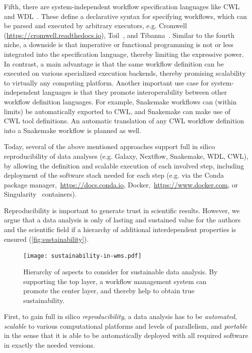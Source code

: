 \documentclass[parskip=half, DIV=18]{scrartcl}
\let\plainurl\url
\renewcommand{\url}[1]{\protect\plainurl{#1}}
\begin{document}
Fifth, there are system-independent workflow specification languages like CWL~\parencite{cwl} and WDL~\parencite{voss_full-stack_2017}.
These define a declarative syntax for specifying workflows, which can be parsed and executed by arbitrary executors, e.g. Cromwell (\url{https://cromwell.readthedocs.io}), Toil~\parencite{Vivian_2017}, and Tibanna~\parencite{Lee_2019}.
Similar to the fourth niche, a downside is that imperative or functional programming is not or less integrated into the specification language, thereby limiting the expressive power.
In contrast, a main advantage is that the same workflow definition can be executed on various specialized execution backends, thereby promising scalability to virtually any computing platform.
Another important use case for system-independent languages is that they promote interoperability between other workflow definition languages.
For example, Snakemake workflows can (within limits) be automatically exported to CWL, and Snakemake can make use of CWL tool definitions.
An automatic translation of any CWL workflow definition into a Snakemake workflow is planned as well.

Today, several of the above mentioned approaches support full in silico reproducibility of data analyses (e.g. Galaxy, Nextflow, Snakemake, WDL, CWL), by allowing the definition and scalable execution of each involved step, including deployment of the software stack needed for each step (e.g. via the Conda package manager,~\url{https://docs.conda.io}, Docker,~\url{https://www.docker.com}, or Singularity~\parencite{kurtzer_singularity_2017} containers).

Reproducibility is important to generate trust in scientific results.
However, we argue that a data analysis is only of lasting and sustained value for the authors and the scientific field if a hierarchy of additional interdependent properties is ensured (\autoref{fig:sustainability}).

\begin{figure}
    \centering
	\texttt{[image: sustainability-in-wms.pdf]}
	\caption{
		Hierarchy of aspects to consider for sustainable data analysis.
		By supporting the top layer, a workflow management system can promote the center layer, and thereby help to obtain true sustainability.
	}\label{fig:sustainability}
\end{figure}

First, to gain full in silico \emph{reproducibility}, a data analysis has to be \emph{automated}, \emph{scalable} to various computational platforms and levels of parallelism, and \emph{portable} in the sense that it is able to be automatically deployed with all required software in exactly the needed versions.
\end{document}
